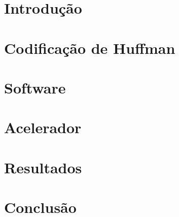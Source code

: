 \documentclass[a4paper]{article}
\begin{document}
	

	\tableofcontents

  \pagebreak

  \setcounter{page}{1}

	\section{Introdução}
  

	\section{Codificação de Huffman}
	\label{sec:theory}
  

	\section{Software}
  

	\section{Acelerador}
	\label{sec:accelerator}
  

	\section{Resultados}
	\label{sec:results}
  

	\section{Conclusão}
  

  \pagebreak

  \listoffigures
  \listoftables

  

\end{document}
